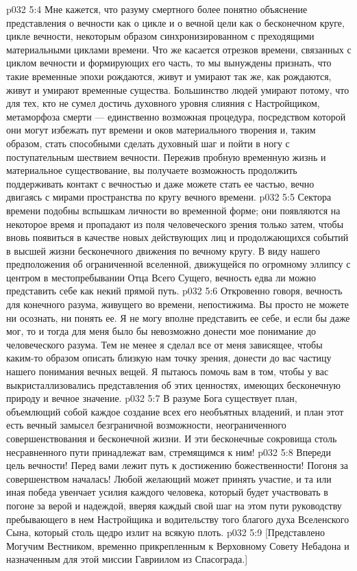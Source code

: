 \vs p032 5:4 Мне кажется, что разуму смертного более понятно объяснение представления о вечности как о цикле и о вечной цели как о бесконечном круге, цикле вечности, некоторым образом синхронизированном с преходящими материальными циклами времени. Что же касается отрезков времени, связанных с циклом вечности и формирующих его часть, то мы вынуждены признать, что такие временные эпохи рождаются, живут и умирают так же, как рождаются, живут и умирают временные существа. Большинство людей умирают потому, что для тех, кто не сумел достичь духовного уровня слияния с Настройщиком, метаморфоза смерти --- единственно возможная процедура, посредством которой они могут избежать пут времени и оков материального творения и, таким образом, стать способными сделать духовный шаг и пойти в ногу с поступательным шествием вечности. Пережив пробную временную жизнь и материальное существование, вы получаете возможность продолжить поддерживать контакт с вечностью и даже можете стать ее частью, вечно двигаясь с мирами пространства по кругу вечного времени.
\vs p032 5:5 Сектора времени подобны вспышкам личности во временной форме; они появляются на некоторое время и пропадают из поля человеческого зрения только затем, чтобы вновь появиться в качестве новых действующих лиц и продолжающихся событий в высшей жизни бесконечного движения по вечному кругу. В виду нашего предположения об ограниченной вселенной, движущейся по огромному эллипсу с центром в местопребывании Отца Всего Сущего, вечность едва ли можно представить себе как некий прямой путь.
\vs p032 5:6 Откровенно говоря, вечность для конечного разума, живущего во времени, непостижима. Вы просто не можете ни осознать, ни понять ее. Я не могу вполне представить ее себе, и если бы даже мог, то и тогда для меня было бы невозможно донести мое понимание до человеческого разума. Тем не менее я сделал все от меня зависящее, чтобы каким\hyp{}то образом описать близкую нам точку зрения, донести до вас частицу нашего понимания вечных вещей. Я пытаюсь помочь вам в том, чтобы у вас выкристаллизовались представления об этих ценностях, имеющих бесконечную природу и вечное значение.
\vs p032 5:7 \pc В разуме Бога существует план, объемлющий собой каждое создание всех его необъятных владений, и план этот есть вечный замысел безграничной возможности, неограниченного совершенствования и бесконечной жизни. И эти бесконечные сокровища столь несравненного пути принадлежат вам, стремящимся к ним!
\vs p032 5:8 Впереди цель вечности! Перед вами лежит путь к достижению божественности! Погоня за совершенством началась! Любой желающий может принять участие, и та или иная победа увенчает усилия каждого человека, который будет участвовать в погоне за верой и надеждой, вверяя каждый свой шаг на этом пути руководству пребывающего в нем Настройщика и водительству того благого духа Вселенского Сына, который столь щедро излит на всякую плоть.
\vsetoff
\vs p032 5:9 [Представлено Могучим Вестником, временно прикрепленным к Верховному Совету Небадона и назначенным для этой миссии Гавриилом из Спасограда.]
